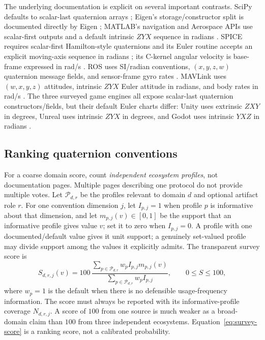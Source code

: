 \documentclass[11pt]{article}
\begin{document}
    The underlying documentation is explicit on several important contrasts. SciPy defaults
    to scalar-last quaternion arrays \cite{scipyQuaternion}; Eigen's storage/constructor split
    is documented directly by Eigen \cite{eigenQuaternion}; MATLAB's navigation and
    Aerospace APIs use scalar-first outputs and a default intrinsic $ZYX$ sequence in radians
    \cite{matlabEul2Quat,matlabAeroAngle2Quat}. SPICE requires scalar-first Hamilton-style
    quaternions and its Euler routine accepts an explicit moving-axis sequence in radians
    \cite{naifQuaternion,naifEuler}; its C-kernel angular velocity is base-frame expressed
    in rad/s \cite{naifCK}. ROS uses SI/radian conventions, $(x,y,z,w)$ quaternion message
    fields, and sensor-frame gyro rates \cite{rosrep103,rosrep145,rosQuaternion}. MAVLink
    uses $(w,x,y,z)$ attitudes, intrinsic $ZYX$ Euler attitude in radians, and body rates in
    rad/s \cite{mavlinkCommon}. The three surveyed game engines all expose scalar-last
    quaternion constructors/fields, but their default Euler charts differ: Unity uses
    extrinsic $ZXY$ in degrees, Unreal uses intrinsic $ZYX$ in degrees, and Godot uses
    intrinsic $YXZ$ in radians \cite{unityQuaternion,unityEuler,unrealQuaternion,unrealRotator,godotQuaternion,godotBasis}.

    \subsection{Ranking quaternion conventions}

    For a coarse domain score, count \emph{independent ecosystem profiles}, not documentation
    pages. Multiple pages describing one protocol do not provide multiple votes. Let
    $\mathcal P_{d,r}$ be the profiles relevant to domain $d$ and optional artifact role $r$.
    For one convention dimension $j$, let $I_{p,j}=1$ when profile $p$ is informative about
    that dimension, and let $m_{p,j}(v)\in[0,1]$ be the support that an informative profile gives value $v$; set it to zero when $I_{p,j}=0$.
    A profile with one documented/default value gives it unit support; a genuinely
    set-valued profile may divide support among the values it explicitly admits. The
    transparent survey score is
    \begin{equation}
        S_{d,r,j}(v)
        =100\,
        \frac{\sum_{p\in\mathcal P_{d,r}}w_p I_{p,j}m_{p,j}(v)}
        {\sum_{p\in\mathcal P_{d,r}}w_p I_{p,j}},
        \qquad 0\le S\le100,
        \label{eq:survey-score}
    \end{equation}
    where $w_p=1$ is the default when there is no defensible usage-frequency information.
    The score must always be reported with its informative-profile coverage $N_{d,r,j}$.
    A score of $100$ from one source is much weaker as a broad-domain claim than $100$ from
    three independent ecosystems. Equation~\eqref{eq:survey-score} is a ranking score, not
    a calibrated probability.
\end{document}

